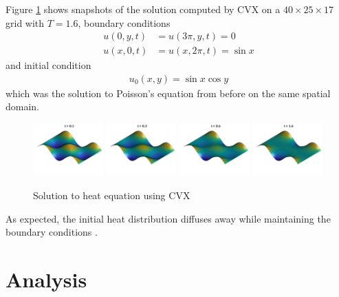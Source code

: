\documentclass[conference]{IEEEtran}
\begin{document}
Figure \ref{fig:heat-solution} shows snapshots of the solution computed by CVX on a $40 \times 25 \times 17$ grid with $T = 1.6$, boundary conditions
\begin{align}
  u(0, y, t) &= u(3\pi, y, t) = 0 \\
  u(x, 0, t) &= u(x, 2\pi, t) = \sin x
\end{align}
and initial condition
\begin{align}
  u_0(x, y) = \sin x \cos y
\end{align}
which was the solution to Poisson's equation from before on the same spatial domain.
\begin{figure}[b]
  \begin{center}
    \includegraphics[width=0.24\textwidth,trim={1cm 1cm 0 0},clip]{figures/heat-solution-1}
    \includegraphics[width=0.24\textwidth,trim={1cm 1cm 0 0},clip]{figures/heat-solution-3}
    \includegraphics[width=0.24\textwidth,trim={1cm 1cm 0 0},clip]{figures/heat-solution-6}
    \includegraphics[width=0.24\textwidth,trim={1cm 1cm 0 0},clip]{figures/heat-solution-16}
    \caption{Solution to heat equation using CVX}
    \label{fig:heat-solution}
  \end{center}
\end{figure}
As expected, the initial heat distribution diffuses away while maintaining the boundary conditions \cite{cn}.


\section{Analysis}
\end{document}
